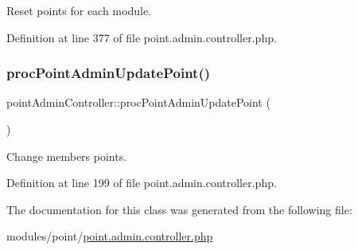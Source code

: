 Reset points for each module. 



Definition at line 377 of file point.\+admin.\+controller.\+php.

\hypertarget{classpointAdminController_a2d90c166719dee56dbee47b7aa5eb30d}{}\label{classpointAdminController_a2d90c166719dee56dbee47b7aa5eb30d} 
\subsubsection{\texorpdfstring{proc\+Point\+Admin\+Update\+Point()}{procPointAdminUpdatePoint()}}
{\footnotesize\ttfamily point\+Admin\+Controller\+::proc\+Point\+Admin\+Update\+Point (\begin{DoxyParamCaption}{ }\end{DoxyParamCaption})}



Change members points. 



Definition at line 199 of file point.\+admin.\+controller.\+php.



The documentation for this class was generated from the following file\+:\begin{DoxyCompactItemize}
\item 
modules/point/\hyperlink{point_8admin_8controller_8php}{point.\+admin.\+controller.\+php}\end{DoxyCompactItemize}

